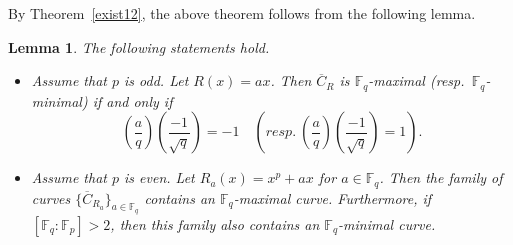 \documentclass[12pt,a4paper]{amsart}
\newtheorem{lemma}[theorem]{Lemma}
\theoremstyle{definition}
\def\F{{\mathbb F}}
\theoremstyle{remark}
\begin{document}
By Theorem~\ref{exist12}, the above theorem follows from the following lemma. 
\begin{lemma}\label{key}
The following statements hold. 
\begin{itemize}
\item[{\rm (i)}] 
Assume that $p$ is odd. 
Let $R(x)=ax$. Then $\overline{C}_{R}$ is 
$\F_q$-maximal (resp.\ $\F_q$-minimal) if and only if
\[
\left(\frac{a}{q}\right) \left(\frac{-1}{\sqrt{q}}\right)=-1 \quad (resp.\ \left(\frac{a}{q}\right) \left(\frac{-1}{\sqrt{q}}\right)=1). 
\]
\item[{\rm (ii)}] Assume that $p$ is even. 
Let $R_a(x)=x^p+ax$ for $a \in \F_q$. Then the family of curves 
$\{\overline{C}_{R_a}\}_{a \in \F_q}$ contains an $\F_q$-maximal curve. 
Furthermore, if $[\F_q:\F_p]>2$, then this family also contains an $\F_q$-minimal curve. 
\end{itemize}
\end{lemma}
\end{document}
